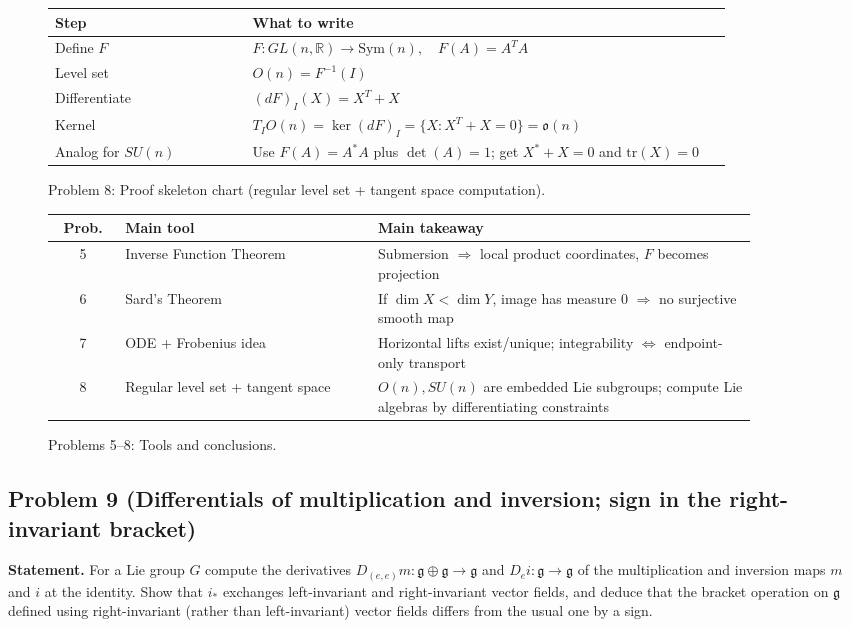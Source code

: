 \documentclass[12pt,a4paper]{article}
\theoremstyle{plain}
\theoremstyle{definition}      %
\begin{document}
\begin{figure}[h]
	\centering
	\renewcommand{\arraystretch}{1.35}
	\begin{tabular}{|p{0.28\linewidth}|p{0.68\linewidth}|}
		\hline
		\textbf{Step} & \textbf{What to write} \\
		\hline
		Define $F$ & $F:GL(n,\mathbb{R})\to \mathrm{Sym}(n),\quad F(A)=A^TA$ \\
		\hline
		Level set & $O(n)=F^{-1}(I)$ \\
		\hline
		Differentiate & $(dF)_I(X)=X^T+X$ \\
		\hline
		Kernel & $T_IO(n)=\ker(dF)_I=\{X:X^T+X=0\}=\mathfrak{o}(n)$ \\
		\hline
		Analog for $SU(n)$ & Use $F(A)=A^*A$ plus $\det(A)=1$; get $X^*+X=0$ and $\mathrm{tr}(X)=0$ \\
		\hline
	\end{tabular}
	\caption{Problem 8: Proof skeleton chart (regular level set + tangent space computation).}
\end{figure}

\begin{figure}[h]
	\centering
	\renewcommand{\arraystretch}{1.35}
	\begin{tabular}{|c|p{0.36\linewidth}|p{0.54\linewidth}|}
		\hline
		\textbf{Prob.} & \textbf{Main tool} & \textbf{Main takeaway} \\
		\hline
		5 & Inverse Function Theorem & Submersion $\Rightarrow$ local product coordinates, $F$ becomes projection \\
		\hline
		6 & Sard's Theorem & If $\dim X<\dim Y$, image has measure $0$ $\Rightarrow$ no surjective smooth map \\
		\hline
		7 & ODE + Frobenius idea & Horizontal lifts exist/unique; integrability $\Leftrightarrow$ endpoint-only transport \\
		\hline
		8 & Regular level set + tangent space & $O(n),SU(n)$ are embedded Lie subgroups; compute Lie algebras by differentiating constraints \\
		\hline
	\end{tabular}
	\caption{Problems 5--8: Tools and conclusions.}
\end{figure}

	
\subsection*{Problem 9 (Differentials of multiplication and inversion; sign in the right-invariant bracket)}
\textbf{Statement.}
For a Lie group $G$ compute the derivatives $D_{(e,e)}m:\mathfrak g\oplus\mathfrak g\to\mathfrak g$ and
$D_e i:\mathfrak g\to\mathfrak g$ of the multiplication and inversion maps $m$ and $i$ at the identity.
Show that $i_*$ exchanges left-invariant and right-invariant vector fields, and deduce that the bracket operation
on $\mathfrak g$ defined using right-invariant (rather than left-invariant) vector fields differs from the usual one by a sign.
\end{document}
